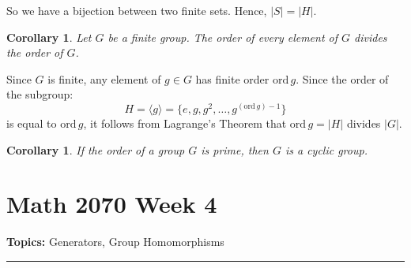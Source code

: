 \documentclass[a4paper,12pt]{report}
\newcommand{\abs}[1]{\left|#1\right|}
\newcommand{\ord}{\mathrm{ord}\,}
\renewcommand{\ord}{\mathrm{ord}\,}
\newcounter{statement}
\numberwithin{statement}{chapter}
\newtheorem{cor}[statement]{Corollary}
\numberwithin{equation}{chapter}
\numberwithin{section}{chapter}
\numberwithin{subsection}{section}
\begin{document}
So we have a bijection between two finite sets.  Hence, $\abs{S} = \abs{H}$.




\begin{cor}
Let $G$ be a finite group.
The order of every element of $G$  divides the order of $G$.
\end{cor}



Since $G$ is finite, any element of $g \in G$ has finite order $\ord g$.
Since the order of the subgroup:
\[
H = \langle g \rangle
= \{e, g, g^2, \ldots, g^{(\ord g) - 1}\}
\]
is equal to $\ord g$,
it follows from Lagrange's Theorem that $\ord g = \abs{H}$ divides $\abs{G}$.



\begin{cor}
If the order of a group $G$ is prime, then $G$ is a cyclic group.
\end{cor}



\setcounter{chapter}{4}\setcounter{section}{0}
\setcounter{subsection}{0}
\setcounter{statement}{0}

\chapter*{Math 2070 Week 4}
{\bf Topics: }Generators, Group Homomorphisms
\hrule
\end{document}
